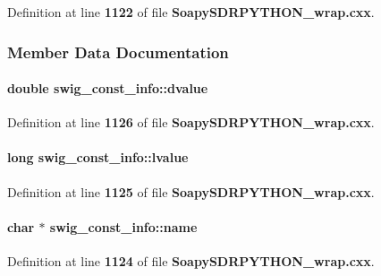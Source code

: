 Definition at line {\bf 1122} of file {\bf Soapy\+S\+D\+R\+P\+Y\+T\+H\+O\+N\+\_\+wrap.\+cxx}.



\subsubsection{Member Data Documentation}
\paragraph[{dvalue}]{\setlength{\rightskip}{0pt plus 5cm}double swig\+\_\+const\+\_\+info\+::dvalue}\label{structswig__const__info_a74e477f1dbf515bcb7e2ef07a1d34c35}


Definition at line {\bf 1126} of file {\bf Soapy\+S\+D\+R\+P\+Y\+T\+H\+O\+N\+\_\+wrap.\+cxx}.

\paragraph[{lvalue}]{\setlength{\rightskip}{0pt plus 5cm}long swig\+\_\+const\+\_\+info\+::lvalue}\label{structswig__const__info_af142e4c21ad4fe61f6c2624bff034583}


Definition at line {\bf 1125} of file {\bf Soapy\+S\+D\+R\+P\+Y\+T\+H\+O\+N\+\_\+wrap.\+cxx}.

\paragraph[{name}]{\setlength{\rightskip}{0pt plus 5cm}char $\ast$ swig\+\_\+const\+\_\+info\+::name}\label{structswig__const__info_adb8a1bc6fcbfb39737a9dc72dfabf8f1}


Definition at line {\bf 1124} of file {\bf Soapy\+S\+D\+R\+P\+Y\+T\+H\+O\+N\+\_\+wrap.\+cxx}.



